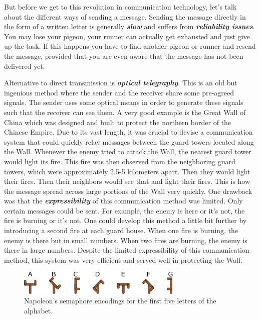 But before we get to this revolution in communication technology, let's talk about the different ways of sending a message.
Sending the message directly in the form of a written letter is generally \textit{\textbf{slow}} and suffers from \textit{\textbf{reliability issues}}.
You may lose your pigeon, your runner can actually get exhausted and just give up the task.
If this happens you have to find another pigeon or runner and resend the message, provided that you are even aware that the message has not been delivered yet.

Alternative to direct transmission is \textit{\textbf{optical telegraphy}}.
This is an old but ingenious method where the sender and the receiver share some pre-agreed signals.
The sender uses some optical means in order to generate these signals such that the receiver can see them.
A very good example is the Great Wall of China which was designed and built to protect the northern border of the Chinese Empire.
Due to its vast length, it was crucial to devise a communication system that could quickly relay messages between the guard towers located along the Wall.
Whenever the enemy tried to attack the Wall, the nearest guard tower would light its fire. This fire was then observed from the neighboring guard towers, which were approximately 2.5-5 kilometers apart.
Then they would light their fires.
Then their neighbors would see that and light their fires.
This is how the message spread across large portions of the Wall very quickly.
One drawback was that the \textit{\textbf{expressibility}} of this communication method was limited.
Only certain messages could be sent.
For example, the enemy is here or it's not, the fire is burning or it's not.
One could develop this method a little bit further by introducing a second fire at each guard house.
When one fire is burning, the enemy is there but in small numbers.
When two fires are burning, the enemy is there in large numbers.
Despite the limited expressibility of this communication method, this system was very efficient and served well in protecting the Wall.

\begin{figure}[t]
    \centering
    \includegraphics[width=0.7\textwidth]{lesson1/1-1_napoleon.pdf}
    \caption[Napoleon's semaphore]{Napoleon's semaphore encodings for the first five letters of the alphabet.}
    \label{fig:1-1_napoleon}
\end{figure}

